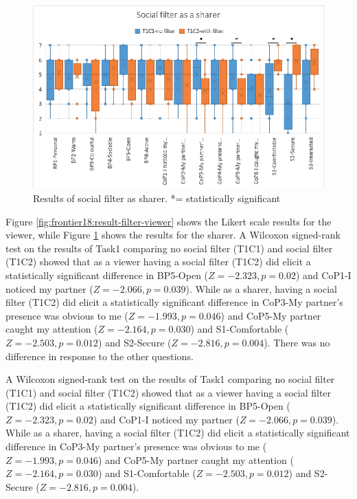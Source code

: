 \begin{figure}
\begin{center}
\includegraphics[width=0.8\linewidth]{images/frontier18/images-04.eps}
\caption{Results of social filter as sharer. *= statistically significant}\label{fig:frontier18:result-filter-sharer}
\end{center}
\end{figure}

Figure \ref{fig:frontier18:result-filter-viewer} shows the Likert scale results for the viewer, while Figure \ref{fig:frontier18:result-filter-sharer} shows the results for the sharer. A Wilcoxon signed-rank test on the results of Task1 comparing no social filter (T1C1) and social filter (T1C2) showed that as a viewer having a social filter (T1C2) did elicit a statistically significant difference in BP5-Open ($Z=-2.323, p=0.02$) and CoP1-I noticed my partner ($Z=-2.066, p=0.039$). While as a sharer, having a social filter (T1C2) did elicit a statistically significant difference in CoP3-My partner's presence was obvious to me ($Z=-1.993, p=0.046$) and CoP5-My partner caught my attention ($Z=-2.164, p=0.030$) and S1-Comfortable ($Z=-2.503, p=0.012$) and S2-Secure ($Z=-2.816, p=0.004$). There was no difference in response to the other questions.

A Wilcoxon signed-rank test on the results of Task1 comparing no social filter (T1C1) and social filter (T1C2) showed that as a viewer having a social filter (T1C2) did elicit a statistically significant difference in BP5-Open ($Z=-2.323, p=0.02$) and CoP1-I noticed my partner ($Z=-2.066, p=0.039$). While as a sharer, having a social filter (T1C2) did elicit a statistically significant difference in CoP3-My partner's presence was obvious to me ($Z=-1.993, p=0.046$) and CoP5-My partner caught my attention ($Z=-2.164, p=0.030$) and S1-Comfortable ($Z=-2.503, p=0.012$) and S2-Secure ($Z=-2.816, p=0.004$).

